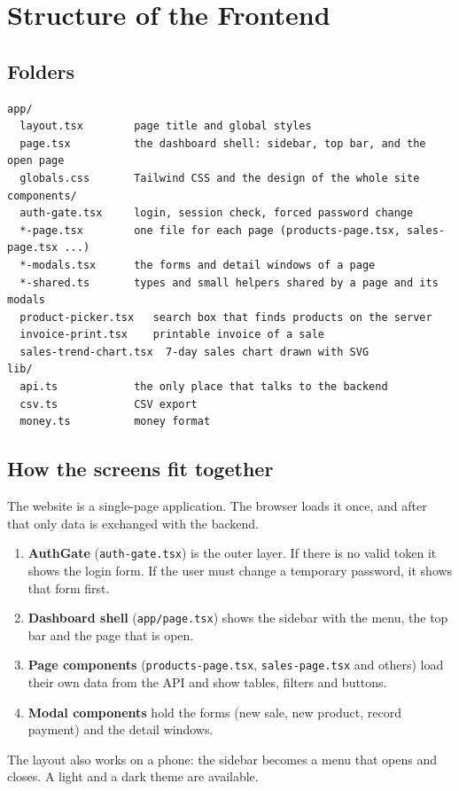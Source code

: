 \documentclass[11pt,a4paper]{article}
\newcommand{\code}[1]{\texttt{#1}}
\begin{document}
\section{Structure of the Frontend}
\subsection{Folders}
\begin{lstlisting}[style=query]
app/
  layout.tsx        page title and global styles
  page.tsx          the dashboard shell: sidebar, top bar, and the open page
  globals.css       Tailwind CSS and the design of the whole site
components/
  auth-gate.tsx     login, session check, forced password change
  *-page.tsx        one file for each page (products-page.tsx, sales-page.tsx ...)
  *-modals.tsx      the forms and detail windows of a page
  *-shared.ts       types and small helpers shared by a page and its modals
  product-picker.tsx   search box that finds products on the server
  invoice-print.tsx    printable invoice of a sale
  sales-trend-chart.tsx  7-day sales chart drawn with SVG
lib/
  api.ts            the only place that talks to the backend
  csv.ts            CSV export
  money.ts          money format
\end{lstlisting}

\subsection{How the screens fit together}
The website is a single-page application. The browser loads it once, and after that only data is exchanged with the backend.
\begin{enumerate}
  \item \textbf{AuthGate} (\code{auth-gate.tsx}) is the outer layer. If there is no valid token it shows the login form. If the user must change a temporary password, it shows that form first.
  \item \textbf{Dashboard shell} (\code{app/page.tsx}) shows the sidebar with the menu, the top bar and the page that is open.
  \item \textbf{Page components} (\code{products-page.tsx}, \code{sales-page.tsx} and others) load their own data from the API and show tables, filters and buttons.
  \item \textbf{Modal components} hold the forms (new sale, new product, record payment) and the detail windows.
\end{enumerate}
The layout also works on a phone: the sidebar becomes a menu that opens and closes. A light and a dark theme are available.
\end{document}
